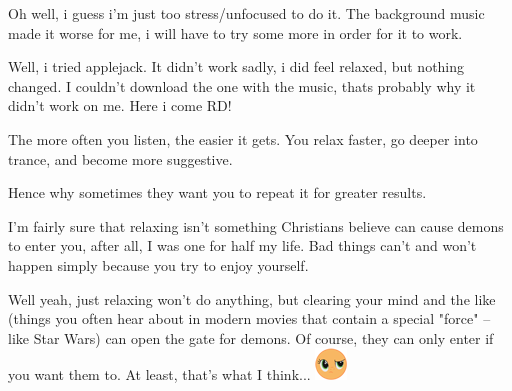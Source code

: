 \documentclass[ebook,12pt,oneside,openany]{memoir}
\newcommand{\mytexttilde}{\raisebox{0.5ex}{\texttildelow}}
\begin{document}
\begin{tcolorbox}[title=The Original,colback=green!5!white,colframe=green!75!black,coltitle=white]
\par{Oh well, i guess i'm just too stress/unfocused to do it. The background music made it worse for me, i will have to try some more in order for it to work.}
\end{tcolorbox}
\begin{tcolorbox}[title=Chigens and Kay,colback=olive!5!white,colframe=olive!75!black,coltitle=white]
\begin{tcolorbox}[title=Ponyworld Destroyer]
\par{Well, i tried applejack. It didn't work sadly, i did feel relaxed, but nothing changed. I couldn't download the one with the music, thats probably why it didn't work on me. Here i come RD!}
\end{tcolorbox}
\par{The more often you listen, the easier it gets. You relax faster, go deeper into trance, and become more suggestive.}
\newline{}
\par{Hence why sometimes they want you to repeat it for greater results.}
\end{tcolorbox}
\begin{tcolorbox}[title=MatrixChicken]
\begin{tcolorbox}[title=\mytexttilde{}Lawful Aeternae Salvtis\mytexttilde{}]
\par{I'm fairly sure that relaxing isn't something Christians believe can cause demons to enter you, after all, I was one for half my life. Bad things can't and won't happen simply because you try to enjoy yourself.}
\end{tcolorbox}
\par{Well yeah, just relaxing won't do anything, but clearing your mind and the like (things you often hear about in modern movies that contain a special "force" -- like Star Wars) can open the gate for demons. Of course, they can only enter if you want them to. At least, that's what I think...  \includegraphics{images/mlp_huh.png}}
\end{tcolorbox}
\end{document}
